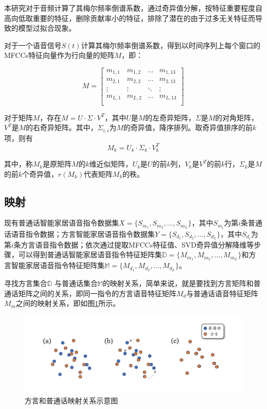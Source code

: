 \documentclass[lang=cn,cite=super]{elegantpaper}
\begin{document}
本研究对于音频计算了其梅尔频率倒谱系数，通过奇异值分解，按特征重要程度自高向低取重要的特征，删除贡献率小的特征，排除了潜在的由于过多无关特征而导致的模型过拟合现象。

对于一个语音信号$S(t)$计算其梅尔频率倒谱系数，得到以时间序列上每个窗口的MFCCs特征向量作为行向量的矩阵$M$，即：

\begin{equation}
    M = 
    \begin{bmatrix}
        m_{1,1} & m_{1,2} & \ldots & m_{1,13} \\
        m_{2,1} & m_{2,2} & \ldots & m_{2,13} \\
        \vdots & \vdots & \ddots & \vdots \\
        m_{L,1} & m_{L,2} & \ldots & m_{L,13}\\
    \end{bmatrix}
\end{equation}

对于矩阵$M$，存在$M = U \cdot \Sigma \cdot V^T$，其中$U$是$M$的左奇异矩阵，$\Sigma$是$M$的对角矩阵，$V^T$是$M$的右奇异矩阵。其中，$\Sigma_{i,i}$为$M$的奇异值，降序排列。取奇异值排序的前$k$项，则有
\begin{equation}
    M_k = U_k \cdot \Sigma_k \cdot V^T_k
\end{equation}

其中，称$M_k$是原矩阵$M$的$k$维近似矩阵，$U_k$是$U$的前$k$列，$V_k$是$V^T$的前$k$行，$\Sigma_k$是$M$的前$k$个奇异值，$r(M_k)$代表矩阵$M_k$的秩。

\subsection{映射}
现有普通话智能家居语音指令数据集$X=\{S_{m_1}, S_{m_2}, \ldots, S_{m_L}\}$，其中$S_{m_i}$为第$i$条普通话语音指令数据；方言智能家居语音指令数据集$Y=\{S_{d_1}, S_{d_2}, \ldots, S_{d_L}\}$，其中$S_{d_i}$为第$i$条方言语音指令数据；依次通过提取MFCCs特征值、SVD奇异值分解降维等步骤，可以得到普通话智能家居语音指令特征矩阵集$\mathbb{D} = \{ M_{m_1}, M_{m_2}, \ldots, M_{m_L}\}$和方言智能家居语音指令特征矩阵集$\mathbb{M} = \{ M_{d_1}, M_{d_2}, \ldots, M_{d_L}\}$。

寻找方言集合$\mathbb{D}$ 与普通话集合$\mathbb{M}$的映射关系，简单来说，就是要找到方言矩阵和普通话矩阵之间的关系，即同一指令的方言语音特征矩阵$M_d$与普通话语音特征矩阵$M_m$之间的映射关系，即如图\ref{fig:map_easy}所示。
\begin{figure}[h]
    \caption{\label{fig:map_easy}方言和普通话映射关系示意图}
    \centering
    \includegraphics[scale=0.3]{Map.png}
\end{figure}
\end{document}
